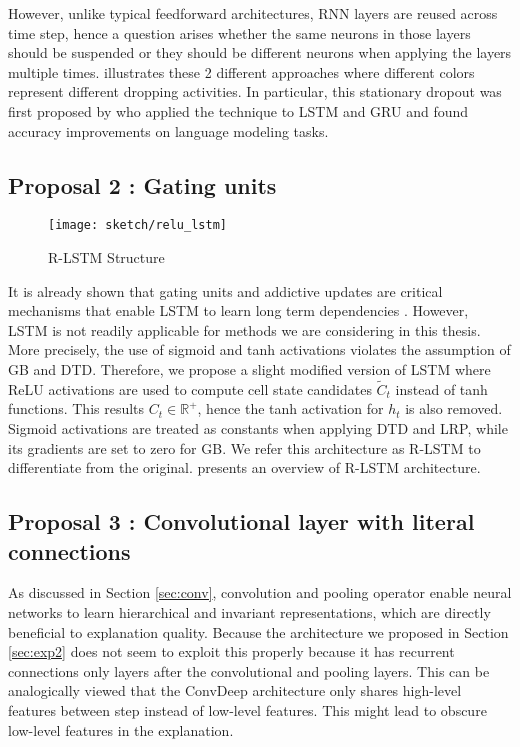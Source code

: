 However, unlike typical feedforward architectures, RNN layers are reused across time step, hence a question arises whether the same neurons in those layers should be suspended or they should be different neurons when applying the layers multiple times. \addfigure{\ref{fig:dropout_lstm}} illustrates these 2 different approaches where different colors represent different dropping activities. In particular, this stationary dropout was first proposed by \cite{GalTheoreticallyGroundedApplication2016} who applied  the technique to LSTM and GRU and found accuracy improvements on language modeling tasks.

\subsection{Proposal 2 : Gating units}
\begin{figure}[!htb]
\centering
\texttt{[image: sketch/relu\_lstm]}
\caption{R-LSTM Structure} 

\label{fig:relu_lstm} 
\end{figure}

It is already shown that gating units and addictive updates are critical mechanisms that enable LSTM to learn long term dependencies \cite{GreffLSTMsearchspace2017, Jozefowiczempiricalexplorationrecurrent2015a}. However, LSTM is not readily applicable for methods we are considering in this thesis. More precisely, the use of sigmoid and tanh activations violates the assumption of GB and DTD. Therefore, we propose a slight modified version of LSTM where ReLU activations are used to compute cell state candidates $\widetilde{C}_t$ instead of tanh functions. This results $C_t \in \mathbb{R}^+$, hence the tanh activation for $h_t$  is also removed.  Sigmoid activations are treated as constants when applying DTD and LRP, while its gradients are set to zero for GB. We refer this architecture as R-LSTM to differentiate from the original.  \addfigure{\ref{fig:relu_lstm}} presents an overview of R-LSTM architecture.


\subsection{Proposal 3 : Convolutional layer with literal connections}
As discussed in Section \ref{sec:conv}, convolution and pooling operator enable neural networks to learn hierarchical and invariant representations, which are directly beneficial to explanation quality. Because the  architecture we proposed in Section \ref{sec:exp2} does not seem to exploit this properly because it has recurrent connections only layers after the convolutional and pooling layers. This can be analogically viewed that the ConvDeep architecture only shares high-level features between step instead of low-level features. This might lead to obscure low-level features in the explanation. 

